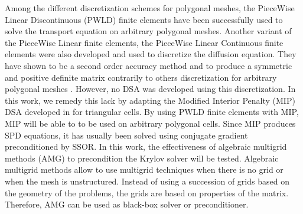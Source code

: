 Among the different discretization schemes for polygonal meshes, the PieceWise 
Linear Discontinuous (PWLD) finite elements \cite{pwld_3d,pwld_2d} 
have been successfully used to solve the transport equation on arbitrary
polygonal meshes. Another variant of the PieceWise Linear finite elements, the
PieceWise Linear Continuous finite elements were also developed and used 
to discretize the diffusion equation. They have shown to be a second order
accuracy method and to produce a symmetric and positive definite matrix 
\cite{pwl_diffusion} contrarily to others discretization for arbitrary
polygonal meshes \cite{pwl_diffusion}. However, no DSA 
\cite{dsa_ref,larsen_dsa,consistent_p1} was developed using this discretization. 
In this work, we remedy this lack by adapting the Modified Interior Penalty 
(MIP) DSA developed in \cite{mip} for triangular cells. By using PWLD finite 
elements with MIP, MIP will be able to to be used on arbitrary polygonal cells. 
Since MIP produces SPD equations, it has usually been solved using conjugate 
gradient preconditioned by SSOR. In this work, the effectiveness of algebraic 
multigrid methods (AMG) to precondition the Krylov solver \cite{amg,amg_course} 
will be tested. Algebraic multigrid methods allow to use multigrid techniques 
when there is no grid or when the mesh is unstructured. Instead of using a 
succession of grids based on the geometry of the problems, the grids are based 
on properties of the matrix. Therefore, AMG can be used as black-box solver or 
preconditioner.
